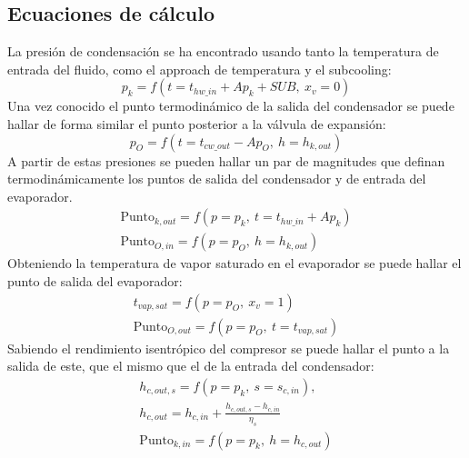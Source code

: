 \documentclass[../main.tex]{subfiles}
\begin{document}
\subsection{Ecuaciones de cálculo}
La presión de condensación se ha encontrado usando tanto la temperatura de 
entrada del fluido, como el approach de temperatura y el subcooling:
\begin{equation}
p_{k} = f(t = t_{hw\_in} + Ap_{k} + SUB,\ x_{v} = 0)
\end{equation}
Una vez conocido el punto termodinámico de la salida del condensador se puede 
hallar de forma similar el punto posterior a la válvula de expansión:
\begin{equation}
p_{O} = f(t = t_{cw\_out} - Ap_{O},\ h = h_{k,out})
\end{equation}
A partir de estas presiones se pueden hallar un par de magnitudes que definan 
termodinámicamente los puntos de salida del condensador y de entrada del 
evaporador.
\begin{gather}
\mathrm{Punto}_{k,out} = f(p = p_{k},\ t = t_{hw\_in} + Ap_{k})
\label{eq:punto_k,out}
\\
\mathrm{Punto}_{O,in} = f(p = p_{O},\ h = h_{k,out})
\label{eq:punto_O,in}
\end{gather}
Obteniendo la temperatura de vapor saturado en el evaporador se puede hallar 
el punto de salida del evaporador:
\begin{gather}
t_{vap,sat} = f(p = p_{O},\ x_{v} = 1)
\label{eq:t_vap_sat}
\\
\mathrm{Punto}_{O,out} = f(p = p_{O},\ t = t_{vap,sat})
\label{eq:punto_O,out}
\end{gather}
Sabiendo el rendimiento isentrópico del compresor se puede hallar el punto 
a la salida de este, que el mismo que el de la entrada del condensador:
\begin{gather}
h_{c,out,s} = f(p = p_{k},\ s = s_{c,in}),\quad
\label{eq:h_c,out,s}
\\
h_{c,out} = h_{c,in} + \frac{h_{c,out,s} - h_{c,in}}{\eta_{s}}
\label{eq:h_c,out}
\\
\mathrm{Punto}_{k,in} = f(p = p_{k},\ h = h_{c,out})
\label{eq:punto_k,in}
\end{gather}
\end{document}
